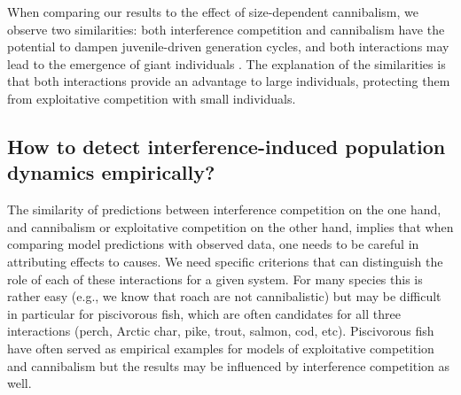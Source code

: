 When comparing our results to the effect of size-dependent cannibalism, we
observe two similarities: both interference competition and cannibalism have the
potential to dampen juvenile-driven generation cycles, and both interactions may
lead to the emergence of giant individuals \autocite[][this
study]{claessen2000a,claessen2002a}. The explanation of the similarities is that
both interactions provide an advantage to large individuals, protecting them
from exploitative competition with small individuals.

\subsection{How to detect interference-induced population dynamics empirically?}

The similarity of predictions between interference competition on the one hand,
and cannibalism or exploitative competition on the other hand, implies that when
comparing model predictions with observed data, one needs to be careful in
attributing effects to causes. We need specific criterions that can distinguish
the role of each of these interactions for a given system. For many species this
is rather easy (e.g., we know that roach are not cannibalistic) but may be
difficult in particular for piscivorous fish, which are often candidates for all
three interactions (perch, Arctic char, pike, trout, salmon, cod, etc).
Piscivorous fish have often served as empirical examples for models of
exploitative competition and cannibalism
\autocite{claessen2000a,claessen2002a,persson2003a,de-roos2013a} but the results
may be influenced by interference competition as well.

